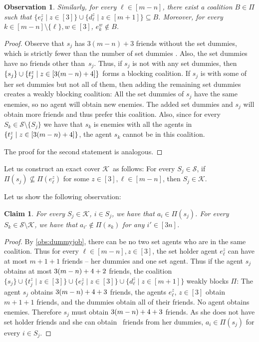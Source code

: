 \documentclass[a4paper,fleqn]{cas-sc}
\newcommand{\partition}{\ensuremath{\Pi}\xspace}
\newcommand{\coalB}{\ensuremath{B}}
\newtheorem{obs}{Observation}
\newtheorem{claim}{Claim}
\newcommand{\sets}{\ensuremath{\mathcal{S}}}
\newcommand{\elements}{\ensuremath{[3n]}}
\newcommand{\sset}[1]{\ensuremath{S_{#1}}}
\newcommand{\ecov}{\ensuremath{\mathcal{K}}}
\begin{document}
{\begin{obs}
Similarly, for every $\ell \in [m -n]$, there exist a coalition $\coalB \in \partition$ such that $\{e^z_\ell \mid z \in [3]\} \cup \{d^z_\ell \mid z \in [m + 1]\} \subseteq B$.
Moreover, for every $k \in [m - n] \setminus \{\ell\}, w \in [3]$, $e^w_k \notin \coalB$.
\end{obs}
\begin{proof}\renewcommand{\qedsymbol}{$\diamond$}
Observe that $s_j$ has $3(m - n) + 3$ friends without the set dummies, which is strictly fewer than the number of set dummies \dumcountc.
Also, the set dummies have no friends other than~$s_j$.
Thus, if $s_j$ is not with any set dummies, then $\{s_j\} \cup \{t^z_j \mid z \in [3(m -n) + 4]\}$ forms a blocking coalition.
If $s_j$ is with some of her set dummies but not all of them, then adding the remaining set dummies creates a weakly blocking coalition: All the set dummies of $s_j$ have the same enemies, so no agent will obtain new enemies.
The added set dummies and $s_j$ will obtain more friends and thus prefer this coalition.
Also, since for every $\sset k \in \sets \setminus \{\sset j\}$ we have that $s_k$ is enemies with all the agents in $\{t^z_j \mid z \in [3(m -n) + 4]\}$, the agent $s_k$ cannot be in this coalition.

The proof for the second statement is analogous.
\end{proof}


Let us construct an exact cover \ecov\ as follows: For every $\sset j \in \sets$, if $\partition(s_j) \nsubseteq \partition(e^z_\ell)$ for some $z \in [3], \ell \in [m - n]$, then $\sset j \in \ecov$.

Let us show the following observation:
\begin{claim}\label{obs:ecovdefalt}
For every $\sset j \in \ecov$, $i \in \sset j$, we have that $a_i \in \partition(s_j)$.
For every $\sset k \in \sets \setminus \ecov$, we have that $a_{i'} \notin \partition(s_k)$ for any $i' \in \elements$.
\end{claim}
\begin{proof}\renewcommand{\qedsymbol}{$\diamond$}
By \cref{obs:dummyjob}, there can be no two set agents who are in the same coalition.
Thus for every $\ell \in [m - n], z \in [3]$, the set holder agent $e^z_\ell$ can have at most $m + 1 + 1$ friends -- her dummies and one set agent.
Thus if the agent $s_j$ obtains at most $3(m -n) + 4 + 2$ friends, the coalition $\{s_j\} \cup \{t^z_j \mid z \in [3]\} \cup \{e^z_\ell \mid z \in [3]\} \cup \{d^z_\ell \mid z \in [m + 1]\}$ weakly blocks \partition: The agent $s_j$ obtains $3(m -n) + 4 + 3$ friends, the agents $e^z_\ell$, $z \in [3]$ obtain $m + 1 + 1$ friends, and the dummies obtain all of their friends. No agent obtains enemies.
Therefore $s_j$ must obtain $3(m -n) + 4 + 3$ friends.
As she does not have set holder friends and she can obtain \dumcountc\ friends from her dummies, $a_i \in \partition(s_j)$ for every $i \in \sset j$.


\end{proof}}
\end{document}

